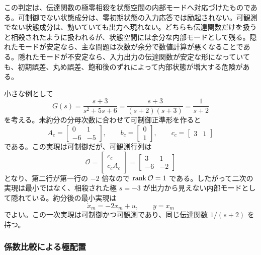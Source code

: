 この判定は、伝達関数の極零相殺を状態空間の内部モードへ対応づけたものである。可制御でない状態成分は、零初期状態の入力応答では励起されない。可観測でない状態成分は、動いていても出力へ現れない。どちらも伝達関数だけを扱うと相殺されたように扱われるが、状態空間には余分な内部モードとして残る。隠れたモードが安定なら、主な問題は次数が余分で数値計算が悪くなることである。隠れたモードが不安定なら、入力出力の伝達関数が安定な形になっていても、初期誤差、丸め誤差、飽和後のずれによって内部状態が増大する危険がある。

小さな例として
\begin{equation}
  G(s)=\frac{s+3}{s^2+5s+6}
      =\frac{s+3}{(s+2)(s+3)}
      =\frac{1}{s+2}
\end{equation}
を考える。未約分の分母次数に合わせて可制御正準形を作ると
\begin{equation}
  A_c=\begin{bmatrix}0&1\\-6&-5\end{bmatrix},\qquad
  b_c=\begin{bmatrix}0\\1\end{bmatrix},\qquad
  c_c=\begin{bmatrix}3&1\end{bmatrix}
\end{equation}
である。この実現は可制御だが、可観測行列は
\begin{equation}
  \mathcal{O}
  =\begin{bmatrix}c_c\\ c_cA_c\end{bmatrix}
  =\begin{bmatrix}3&1\\-6&-2\end{bmatrix}
\end{equation}
となり、第二行が第一行の $-2$ 倍なので $\operatorname{rank}\mathcal{O}=1$ である。したがって二次の実現は最小ではなく、相殺された極 $s=-3$ が出力から見えない内部モードとして隠れている。約分後の最小実現は
\begin{equation}
  \dot{x}_m=-2x_m+u,\qquad y=x_m
\end{equation}
でよい。この一次実現は可制御かつ可観測であり、同じ伝達関数 $1/(s+2)$ を持つ。

\subsubsection{係数比較による極配置}

